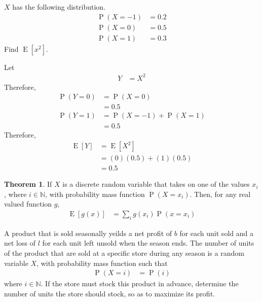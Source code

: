 \documentclass[titlepage, fleqn, a4paper, 12pt, twoside]{article}
\theoremstyle{definition}
\theoremstyle{theorem}
\newtheorem{theorem}{Theorem}
\DeclareMathOperator{\prob}{\mathrm{P}}
\DeclareMathOperator{\expct}{\mathrm{E}}
\begin{document}
\begin{question}
	$X$ has the following distribution.
	\begin{align*}
		\prob(X = -1) & = 0.2 \\
		\prob(X = 0)  & = 0.5 \\
		\prob(X = 1)  & = 0.3
	\end{align*}
	Find $\expct\left[ x^2 \right]$.
\end{question}

\begin{solution}
	Let
	\begin{align*}
		Y & = X^2
	\end{align*}
	Therefore,
	\begin{align*}
		\prob(Y = 0) & = \prob(X = 0)                 \\
                             & = 0.5                          \\
		\prob(Y = 1) & = \prob(X = -1) + \prob(X = 1) \\
                             & = 0.5
	\end{align*}
	Therefore,
	\begin{align*}
		\expct[Y] & = \expct\left[ X^2 \right] \\
                          & = (0) (0.5) + (1) (0.5)    \\
                          & = 0.5
	\end{align*}
\end{solution}

\begin{theorem}
	If $X$ is a discrete random variable that takes on one of the values $x_i$, where $i \in \mathbb{N}$, with probability mass function $\prob(X = x_i)$.
	Then, for any real valued function $g$,
	\begin{align*}
		\expct\left[ g(x) \right] & = \sum\limits_{i} g(x_i) \prob(x = x_i)
	\end{align*}
\end{theorem}

\begin{question}
	A product that is sold seasonally yeilds a net profit of $b$ for each unit sold and a net loss of $l$ for each unit left unsold when the season ends.
	The number of units of the product that are sold at a specific store during any season is a random variable $X$, with probability mass function such that
	\begin{align*}
		\prob(X = i) & = \prob(i)
	\end{align*}
	where $i \in \mathbb{N}$.
	If the store must stock this product in advance, determine the number of units the store should stock, so as to maximize its profit.
\end{question}
\end{document}
